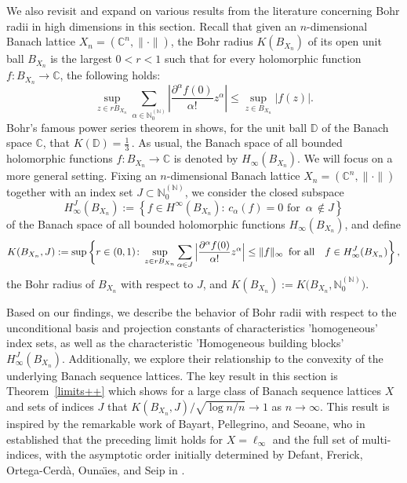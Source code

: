 \documentclass[12pt]{amsart}
\numberwithin{subsection}{section}
\theoremstyle{definition}
\theoremstyle{remark}
\newcommand{\NN}{\mathbb N}
\newcommand{\CC}{\mathbb C}
\begin{document}
We also revisit and expand on various results from the literature concerning Bohr radii in high dimensions in this section.
Recall that given an $n$-dimensional Banach lattice $X_n = (\mathbb{C}^n, \| \cdot \|)$, the Bohr radius $K(B_{X_n})$ of its open unit ball $B_{X_n}$ is the largest $0 < r < 1$ such that for every holomorphic function $f: B_{X_n} \to \mathbb{C}$, the following holds:
\[
\sup_{z \in r B_{X_n}} \sum_{\alpha \in \mathbb{N}_0^{(\mathbb{N})}} \left|\frac{\partial^\alpha f(0)}{\alpha!} z^\alpha \right| \le \sup_{z \in B_{X_n}} |f(z)|.
\]
Bohr's famous power series theorem in \cite{bohr1914theorem} shows, for the unit ball $\mathbb{D}$ of the Banach space
$\mathbb{C}$, that $K(\mathbb{D}) = \frac{1}{3}\,$. As usual, the Banach space of all bounded holomorphic functions
$f\colon B_{X_n} \to \mathbb{C}$ is denoted by $H_\infty(B_{X_n})$.
We will focus on a more general setting. Fixing  an  $n$-dimensional  Banach lattice
$X_n = (\CC^n, \|\cdot\|)$ together with 
an index set $J \subset \NN_0^{(\NN)}$, we consider the closed subspace
\[
H_{\infty}^{J}(B_{X_n}) :=  \left\lbrace f \in H^\infty(B_{X_n}) : \, c_\alpha(f) = 0 \text{ for } \, \alpha \, \notin J \right\rbrace
\]
of the Banach space of all bounded holomorphic functions $H_\infty(B_{X_n})$, and define
\begin{equation}\label{definitionB}
K(B_{X_n},J) := \sup \bigg\{r\in (0, 1) \colon \sup_{z \in r  B_{X_n}}
\sum_{\alpha \in J} \Big|\frac{\partial^\alpha f(0)}{\alpha!} z^\alpha\Big|
\le \|f\|_\infty \,\,\, \text{for all \,\, $f \in H^J_\infty (B_{X_n})$} \bigg\}\,,
\end{equation}
the Bohr radius of $B_{X_n}$ with respect to $J$, and  $K(B_{X_n}) := K\big(B_{X_n}, \NN_0^{(\NN)}\big)$.

Based on our findings, we describe the behavior of Bohr radii with respect to the unconditional basis and projection constants of
characteristics 'homogeneous' index sets, as well as the characteristic 'Homogeneous building blocks' $H^{J}_{\infty}(B_{X_n})$.
Additionally, we explore their relationship to the convexity of the underlying Banach sequence lattices. The key result in this
section  is Theorem~\ref{limits++} which shows for a large class of Banach sequence lattices $X$ and sets of indices $J$  that
$K(B_{X_n},J)\big/\sqrt{\log n /n} \to  1$ as $n \to \infty$. This result is inspired by the remarkable work of Bayart, Pellegrino, and Seoane, who in \cite{bayart2014bohr} established that the preceding limit holds for $X = \ell_{\infty}$ and the full set of multi-indices, with the asymptotic order initially determined by Defant, Frerick, Ortega-Cerd{\`a}, Ouna{\"{\i}}es, and Seip in \cite{defant2011bohnenblust}.
\end{document}
